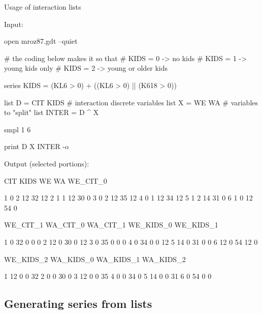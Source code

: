 \begin{script}[ht]
  \caption{Usage of interaction lists}
  \label{ex:interact_list}
Input:
\begin{scodebit}
open mroz87.gdt --quiet

# the coding below makes it so that
# KIDS = 0 -> no kids
# KIDS = 1 -> young kids only
# KIDS = 2 -> young or older kids

series KIDS = (KL6 > 0) + ((KL6 > 0) || (K618 > 0))

list D = CIT KIDS # interaction discrete variables 
list X = WE WA    # variables to "split"
list INTER = D ^ X

smpl 1 6

print D X INTER -o
\end{scodebit}
Output (selected portions):
\begin{scodebit}
           CIT         KIDS           WE           WA     WE_CIT_0

1            0            2           12           32           12
2            1            1           12           30            0
3            0            2           12           35           12
4            0            1           12           34           12
5            1            2           14           31            0
6            1            0           12           54            0

      WE_CIT_1     WA_CIT_0     WA_CIT_1    WE_KIDS_0    WE_KIDS_1

1            0           32            0            0            0
2           12            0           30            0           12
3            0           35            0            0            0
4            0           34            0            0           12
5           14            0           31            0            0
6           12            0           54           12            0

     WE_KIDS_2    WA_KIDS_0    WA_KIDS_1    WA_KIDS_2

1           12            0            0           32
2            0            0           30            0
3           12            0            0           35
4            0            0           34            0
5           14            0            0           31
6            0           54            0            0

\end{scodebit}
\end{script}

\subsection{Generating series from lists}

